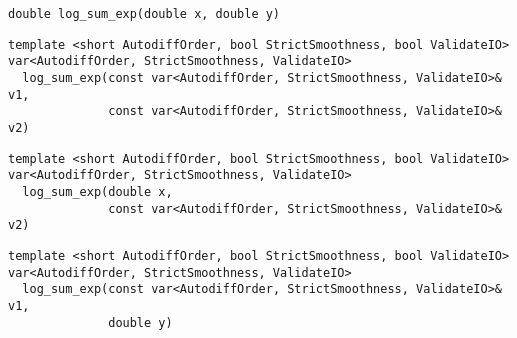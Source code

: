 \begin{tcolorbox}[colback=white,colframe=gray90, coltitle=black,boxrule=3pt,
fonttitle=\bfseries,title= Log Sum Exp]

\begin{verbatim}
double log_sum_exp(double x, double y)

\end{verbatim}

\begin{verbatim}
template <short AutodiffOrder, bool StrictSmoothness, bool ValidateIO>
var<AutodiffOrder, StrictSmoothness, ValidateIO>
  log_sum_exp(const var<AutodiffOrder, StrictSmoothness, ValidateIO>& v1,
              const var<AutodiffOrder, StrictSmoothness, ValidateIO>& v2)

\end{verbatim}

\begin{verbatim}
template <short AutodiffOrder, bool StrictSmoothness, bool ValidateIO>
var<AutodiffOrder, StrictSmoothness, ValidateIO>
  log_sum_exp(double x,
              const var<AutodiffOrder, StrictSmoothness, ValidateIO>& v2)

\end{verbatim}

\begin{verbatim}
template <short AutodiffOrder, bool StrictSmoothness, bool ValidateIO>
var<AutodiffOrder, StrictSmoothness, ValidateIO>
  log_sum_exp(const var<AutodiffOrder, StrictSmoothness, ValidateIO>& v1,
              double y)

\end{verbatim}

\end{tcolorbox}

